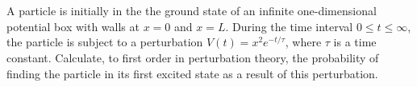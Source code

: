 \documentclass[11pt]{article}
\newenvironment{statement}[1]
{
	\section{#1}
	\color{darkgray}
	\ignorespaces
}
{
}
\begin{document}
\newcommand{\Vt}{V(t)}
\newcommand{\psiE}{\psi_E}
\newcommand{\qp}{^{(1)}}
\newcommand{\cnq}{c_n\qp}
\newcommand{\cnqt}{\cnq(t)}
\newcommand{\too}{t_0}
\newcommand{\inttot}{\int_{\too}^t}
\newcommand{\omg}{\omega}
\newcommand{\omgni}{\omg_{n i}}
\newcommand{\dtp}{\dd{t'}}
\newcommand{\Ho}{H_0}
\newcommand{\psiq}{\psi_1}
\newcommand{\psiw}{\psi_2}
\newcommand{\psiqt}{\psiq(t)}
\newcommand{\psiwt}{\psiw(t)}
\newcommand{\Eq}{E_1}
\newcommand{\Ew}{E_2}
\newcommand{\dxp}{\dd{x'}}
\newcommand{\dxpp}{\dd{x''}}
\newcommand{\intoi}{\int_0^\infty}
\newcommand{\intoL}{\int_0^L}
\newcommand{\intopi}{\int_0^\pi}
\newcommand{\intoepi}{\int_0^{3\pi}}
\newcommand{\du}{\dd{u}}
\newcommand{\ddv}{\dd{v}}


\begin{statement}{}
	A particle is initially in the the ground state of an infinite one-dimensional potential box with walls at $x = 0$ and $x = L$.  During the time interval $0 \leq t \leq \infty$, the particle is subject to a perturbation $\Vt = x^2 e^{-t/\tau}$, where $\tau$ is a time constant.  Calculate, to first order in perturbation theory, the probability of finding the particle in its first excited state as a result of this perturbation.
\end{statement}
\end{document}
